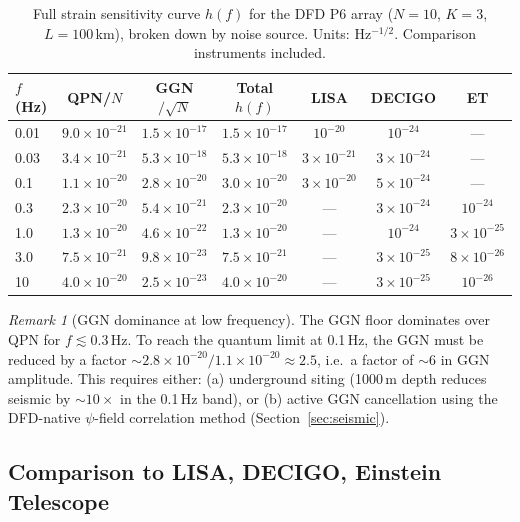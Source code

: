 \documentclass[11pt]{article}
\theoremstyle{definition}
\theoremstyle{remark}
\newtheorem{remark}[theorem]{Remark}
\begin{document}
\begin{table}[h]
\centering
\caption{Full strain sensitivity curve $h(f)$ for the DFD P6 array ($N=10$,
$K=3$, $L=100$\,km), broken down by noise source. Units: Hz$^{-1/2}$.
Comparison instruments included.}
\label{tab:full-hf}
\begin{tabular}{@{}lcccccc@{}}
\toprule
$f$ (Hz) & QPN/$N$ & GGN$/\sqrt{N}$ & Total $h(f)$ & LISA & DECIGO & ET \\
\midrule
0.01 & $9.0\times10^{-21}$ & $1.5\times10^{-17}$ & $1.5\times10^{-17}$ & $10^{-20}$ & $10^{-24}$ & --- \\
0.03 & $3.4\times10^{-21}$ & $5.3\times10^{-18}$ & $5.3\times10^{-18}$ & $3\times10^{-21}$ & $3\times10^{-24}$ & --- \\
0.1  & $1.1\times10^{-20}$ & $2.8\times10^{-20}$ & $3.0\times10^{-20}$ & $3\times10^{-20}$ & $5\times10^{-24}$ & --- \\
0.3  & $2.3\times10^{-20}$ & $5.4\times10^{-21}$ & $2.3\times10^{-20}$ & --- & $3\times10^{-24}$ & $10^{-24}$ \\
1.0  & $1.3\times10^{-20}$ & $4.6\times10^{-22}$ & $1.3\times10^{-20}$ & --- & $10^{-24}$ & $3\times10^{-25}$ \\
3.0  & $7.5\times10^{-21}$ & $9.8\times10^{-23}$ & $7.5\times10^{-21}$ & --- & $3\times10^{-25}$ & $8\times10^{-26}$ \\
10   & $4.0\times10^{-20}$ & $2.5\times10^{-23}$ & $4.0\times10^{-20}$ & --- & $3\times10^{-25}$ & $10^{-26}$ \\
\bottomrule
\end{tabular}
\end{table}

\begin{remark}[GGN dominance at low frequency]
The GGN floor dominates over QPN for $f \lesssim 0.3$\,Hz. To reach the
quantum limit at 0.1\,Hz, the GGN must be reduced by a factor
$\sim 2.8\times10^{-20}/1.1\times10^{-20} \approx 2.5$, i.e.\ a factor
of $\sim 6$ in GGN amplitude. This requires either: (a) underground siting
(1000\,m depth reduces seismic by $\sim 10\times$ in the 0.1\,Hz band),
or (b) active GGN cancellation using the DFD-native $\psi$-field correlation
method (Section~\ref{sec:seismic}).
\end{remark}

\subsection{Comparison to LISA, DECIGO, Einstein Telescope}
\end{document}
